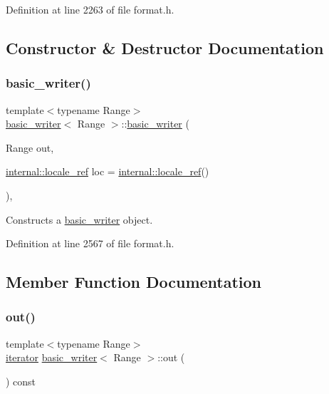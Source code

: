 Definition at line 2263 of file format.\+h.



\subsection{Constructor \& Destructor Documentation}
\mbox{\label{classbasic__writer_adf48e39fa8f224aad0d3e1da992d505d}} 
\subsubsection{\texorpdfstring{basic\+\_\+writer()}{basic\_writer()}}
{\footnotesize\ttfamily template$<$typename Range$>$ \\
\hyperlink{classbasic__writer}{basic\+\_\+writer}$<$ Range $>$\+::\hyperlink{classbasic__writer}{basic\+\_\+writer} (\begin{DoxyParamCaption}\item[{Range}]{out,  }\item[{\hyperlink{classinternal_1_1locale__ref}{internal\+::locale\+\_\+ref}}]{loc = {\ttfamily \hyperlink{classinternal_1_1locale__ref}{internal\+::locale\+\_\+ref}()} }\end{DoxyParamCaption})\hspace{0.3cm}{\ttfamily [inline]}, {\ttfamily [explicit]}}

Constructs a {\ttfamily \hyperlink{classbasic__writer}{basic\+\_\+writer}} object. 

Definition at line 2567 of file format.\+h.



\subsection{Member Function Documentation}
\mbox{\label{classbasic__writer_abeb203681ca5e1d2b5fe1d2a7bbd7996}} 
\subsubsection{\texorpdfstring{out()}{out()}}
{\footnotesize\ttfamily template$<$typename Range$>$ \\
\hyperlink{classbasic__writer_a8e2b191740ebdbd67284ff5d5647ff62}{iterator} \hyperlink{classbasic__writer}{basic\+\_\+writer}$<$ Range $>$\+::out (\begin{DoxyParamCaption}{ }\end{DoxyParamCaption}) const\hspace{0.3cm}{\ttfamily [inline]}}



